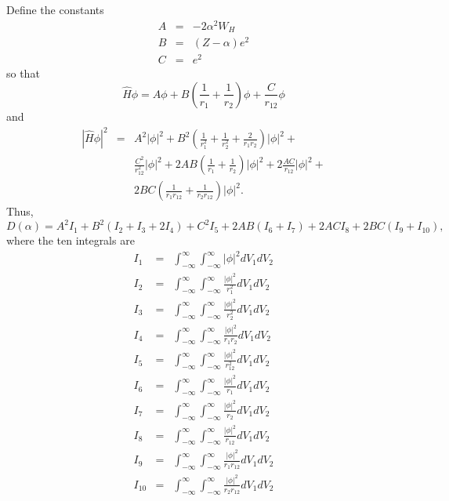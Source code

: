 \documentclass{article}
\numberwithin{equation}{section}
\begin{document}
Define the constants
\begin{eqnarray}
A &=& -2\alpha^2 W_H \label{s5e58} \\
B &=& (Z - \alpha) e^2 \label{s5e59} \\
C &=& e^2 \label{s5e60}
\end{eqnarray}
so that
\begin{equation}\label{s5e61}
\hat{H}\phi = A\phi + B\left(\frac{1}{r_1} + \frac{1}{r_2}\right)\phi +
\frac{C}{r_{12}}\phi
\end{equation}
and
\begin{eqnarray*}
|\hat{H}\phi|^2 &=& A^2|\phi|^2 + B^2\left(\frac{1}{r_1^2} + 
  \frac{1}{r_2^2} + \frac{2}{r_1r_2}\right)|\phi|^2 + \\
  & & \frac{C^2}{r_{12}^2}|\phi|^2 + 2AB\left(\frac{1}{r_1}+\frac{1}{r_2}
  \right)|\phi|^2 + 2\frac{AC}{r_{12}}|\phi|^2 + \\
  & & 2BC\left(\frac{1}{r_1r_{12}} + \frac{1}{r_2r_{12}}\right)|\phi|^2.
\end{eqnarray*}
Thus,
\begin{equation}\label{s5e62}
D(\alpha) = A^2I_1 + B^2(I_2 + I_3 + 2I_4) + C^2I_5 + 2AB(I_6 + I_7) 
    + 2ACI_8 + 2BC(I_9 + I_{10}),
\end{equation}
where the ten integrals are
\begin{eqnarray}
I_1 &=& \int_{-\infty}^\infty\int_{-\infty}^\infty |\phi|^2 dV_1 dV_2 
        \label{s5e63} \\
I_2 &=& \int_{-\infty}^\infty\int_{-\infty}^\infty\frac{|\phi|^2}{r_1^2}
        dV_1dV_2\label{s5e64}\\
I_3 &=& \int_{-\infty}^\infty\int_{-\infty}^\infty\frac{|\phi|^2}{r_2^2}
        dV_1dV_2\label{s5e65}\\
I_4 &=& \int_{-\infty}^\infty\int_{-\infty}^\infty\frac{|\phi|^2}{r_1r_2}
        dV_1dV_2\label{s5e66}\\
I_5 &=& \int_{-\infty}^\infty\int_{-\infty}^\infty\frac{|\phi|^2}{r_{12}^2}
        dV_1dV_2\label{s5e67}\\
I_6 &=& \int_{-\infty}^\infty\int_{-\infty}^\infty\frac{|\phi|^2}{r_1}
        dV_1dV_2\label{s5e68}\\
I_7 &=& \int_{-\infty}^\infty\int_{-\infty}^\infty\frac{|\phi|^2}{r_2}
        dV_1dV_2\label{s5e69}\\
I_8 &=& \int_{-\infty}^\infty\int_{-\infty}^\infty\frac{|\phi|^2}{r_{12}}
        dV_1dV_2\label{s5e70}\\
I_9 &=& \int_{-\infty}^\infty\int_{-\infty}^\infty\frac{|\phi|^2}
        {r_1r_{12}}dV_1dV_2 \label{s5e71}\\
I_{10} &=& \int_{-\infty}^\infty\int_{-\infty}^\infty\frac{|\phi|^2}
        {r_2r_{12}}dV_1dV_2 \label{s5e72}
\end{eqnarray}
\end{document}
